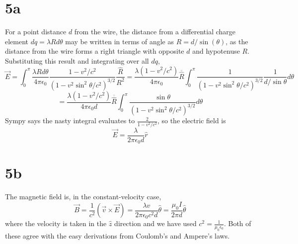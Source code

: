 \documentclass{article}
\begin{document}
\section*{5a}
For a point distance $d$ from the wire, the distance from a differential charge element $dq=\lambda Rd\theta$ may be written in terms of angle as
$R=d/\sin(\theta)$, as the distance from the wire forms a right triangle with opposite $d$ and hypotenuse $R$.
Substituting this result and integrating over all $dq$,
\[
  \vec{E}=\int_{0}^{\pi}\frac{\lambda Rd\theta}{4\pi\epsilon_{0}}\frac{1-v^{2}/c^{2}}{(1-v^{2}\sin^{2}\theta/c^{2})^{3/2}}\frac{\hat{R}}{R^{2}}
  =\frac{\lambda(1-v^{2}/c^{2})}{4\pi\epsilon_{0}}\overline{\hat{R}}
  \int_{0}^{\pi}\frac{1}{(1-v^{2}\sin^{2}\theta/c^{2})^{3/2}}\frac{1}{d/\sin\theta}d\theta
\]
\[
  =\frac{\lambda(1-v^{2}/c^{2})}{4\pi\epsilon_{0}d}\overline{\hat{R}}\int_{0}^{\pi}\frac{\sin\theta}{(1-v^{2}\sin^{2}\theta/c^{2})^{3/2}}d\theta
\]
Sympy says the nasty integral evaluates to $\frac{2}{1-v^{2}/c^{2}}$, so the electric field is
\[\vec{E}=\frac{\lambda}{2\pi\epsilon_{0}d}\hat{r}\]
\section*{5b}
The magnetic field is, in the constant-velocity case,
\[
  \vec{B}=\frac{1}{c^{2}}(\vec{v}\times\vec{E})
  =\frac{\lambda v}{2\pi\epsilon_{0}c^{2}d}\hat{\theta}=\frac{\mu_{0}I}{2\pi d}\hat{\theta}
\]
where the velocity is taken in the $\hat{z}$ direction and we have used $c^{2}=\frac{1}{\mu_{0}\epsilon_{0}}$.
Both of these agree with the easy derivations from Coulomb's and Ampere's laws.
\end{document}
